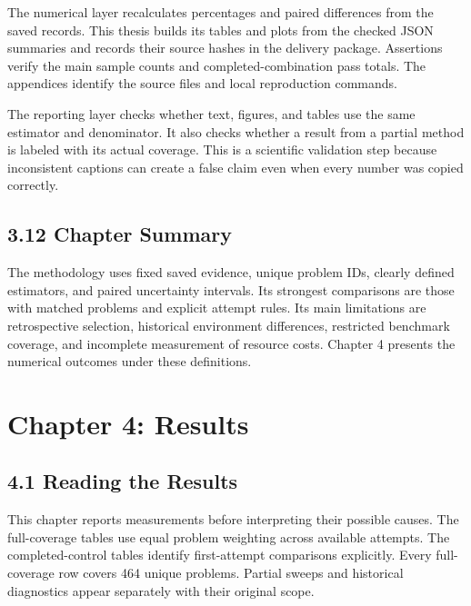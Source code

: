 \documentclass[11pt,letterpaper]{article}
\begin{document}
The numerical layer recalculates percentages and paired differences from the saved records. This thesis builds its tables and plots from the checked JSON summaries and records their source hashes in the delivery package. Assertions verify the main sample counts and completed-combination pass totals. The appendices identify the source files and local reproduction commands.\par

The reporting layer checks whether text, figures, and tables use the same estimator and denominator. It also checks whether a result from a partial method is labeled with its actual coverage. This is a scientific validation step because inconsistent captions can create a false claim even when every number was copied correctly.\par

\subsection*{3.12 Chapter Summary}

The methodology uses fixed saved evidence, unique problem IDs, clearly defined estimators, and paired uncertainty intervals. Its strongest comparisons are those with matched problems and explicit attempt rules. Its main limitations are retrospective selection, historical environment differences, restricted benchmark coverage, and incomplete measurement of resource costs. Chapter 4 presents the numerical outcomes under these definitions.\par

\clearpage

\section*{Chapter 4: Results}

\subsection*{4.1 Reading the Results}

This chapter reports measurements before interpreting their possible causes. The full-coverage tables use equal problem weighting across available attempts. The completed-control tables identify first-attempt comparisons explicitly. Every full-coverage row covers 464 unique problems. Partial sweeps and historical diagnostics appear separately with their original scope.\par
\end{document}
